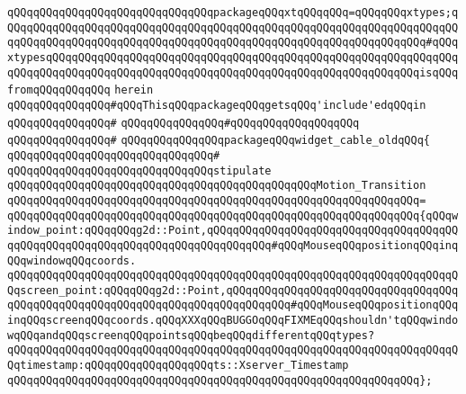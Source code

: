 \verb|qQQqqQQqqQQqqQQqqQQqqQQqqQQqqQQqpackageqQQqxtqQQqqQQq=qQQqqQQqxtypes;qQQqqQQqqQQqqQQqqQQqqQQqqQQqqQQqqQQqqQQqqQQqqQQqqQQqqQQqqQQqqQQqqQQqqQQqqQQqqQQqqQQqqQQqqQQqqQQqqQQqqQQqqQQqqQQqqQQqqQQqqQQqqQQqqQQqqQQq#qQQqxtypesqQQqqQQqqQQqqQQqqQQqqQQqqQQqqQQqqQQqqQQqqQQqqQQqqQQqqQQqqQQqqQQqqQQqqQQqqQQqqQQqqQQqqQQqqQQqqQQqqQQqqQQqqQQqqQQqqQQqqQQqqQQqqQQqisqQQqfromqQQqqQQqqQQq|\newline
\verb|herein|\newline
\newline
\verb|qQQqqQQqqQQqqQQq#qQQqThisqQQqpackageqQQqgetsqQQq'include'edqQQqin|\newline
\verb|qQQqqQQqqQQqqQQq#|\newline
\verb|qQQqqQQqqQQqqQQq#qQQqqQQqqQQqqQQqqQQq|\newline
\verb|qQQqqQQqqQQqqQQq#|\newline
\verb|qQQqqQQqqQQqqQQqpackageqQQqwidget_cable_oldqQQq{|\newline
\verb|qQQqqQQqqQQqqQQqqQQqqQQqqQQqqQQq#|\newline
\verb|qQQqqQQqqQQqqQQqqQQqqQQqqQQqqQQqstipulate|\newline
\newline
\verb|qQQqqQQqqQQqqQQqqQQqqQQqqQQqqQQqqQQqqQQqqQQqqQQqMotion_Transition|\newline
\verb|qQQqqQQqqQQqqQQqqQQqqQQqqQQqqQQqqQQqqQQqqQQqqQQqqQQqqQQqqQQqqQQq=|\newline
\verb|qQQqqQQqqQQqqQQqqQQqqQQqqQQqqQQqqQQqqQQqqQQqqQQqqQQqqQQqqQQqqQQq{qQQqwindow_point:qQQqqQQqg2d::Point,qQQqqQQqqQQqqQQqqQQqqQQqqQQqqQQqqQQqqQQqqQQqqQQqqQQqqQQqqQQqqQQqqQQqqQQqqQQqqQQq#qQQqMouseqQQqpositionqQQqinqQQqwindowqQQqcoords.|\newline
\verb|qQQqqQQqqQQqqQQqqQQqqQQqqQQqqQQqqQQqqQQqqQQqqQQqqQQqqQQqqQQqqQQqqQQqqQQqscreen_point:qQQqqQQqg2d::Point,qQQqqQQqqQQqqQQqqQQqqQQqqQQqqQQqqQQqqQQqqQQqqQQqqQQqqQQqqQQqqQQqqQQqqQQqqQQqqQQq#qQQqMouseqQQqpositionqQQqinqQQqscreenqQQqcoords.qQQqXXXqQQqBUGGOqQQqFIXMEqQQqshouldn'tqQQqwindowqQQqandqQQqscreenqQQqpointsqQQqbeqQQqdifferentqQQqtypes?|\newline
\verb|qQQqqQQqqQQqqQQqqQQqqQQqqQQqqQQqqQQqqQQqqQQqqQQqqQQqqQQqqQQqqQQqqQQqqQQqtimestamp:qQQqqQQqqQQqqQQqqQQqts::Xserver_Timestamp|\newline
\verb|qQQqqQQqqQQqqQQqqQQqqQQqqQQqqQQqqQQqqQQqqQQqqQQqqQQqqQQqqQQqqQQq};|\newline
